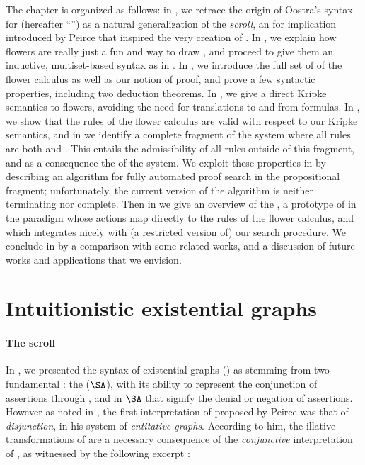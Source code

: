 \begin{scope}
The chapter is organized as follows: in , we retrace the origin of
Oostra's syntax for   (hereafter ``'') as a
natural generalization of the \emph{scroll}, an  for implication introduced
by Peirce that inspired the very creation of . In , we
explain how flowers are really just a fun and  way to draw
, and proceed to give them an inductive, multiset-based syntax as in
. In , we introduce the full set of  of the flower calculus as well as our notion of proof, and prove a few
syntactic properties, including two deduction theorems. In ,
we give a direct Kripke semantics to flowers, avoiding the need for translations
to and from formulas. In , we show that the rules of the
flower calculus are valid with respect to our Kripke semantics, and in
 we identify a complete fragment of the system where all
rules are both \emph{} and \emph{}. This entails the
admissibility of all rules outside of this fragment, and as a consequence the
 of the system. We exploit these properties in
 by describing an algorithm for fully automated proof
search in the propositional fragment; unfortunately, the current version of the
algorithm is neither terminating nor complete. Then in 
we give an overview of the , a prototype of  in the
 paradigm whose actions map directly to the rules of the flower
calculus, and which integrates nicely with (a restricted version of) our search
procedure. We conclude in  by a comparison with some related
works, and a discussion of future works and applications that we envision.


\section{Intuitionistic existential graphs}

\paragraph{The scroll}

In , we presented the syntax of existential graphs () as
stemming from two fundamental : the  ($\SA$),
with its ability to represent the conjunction of assertions through
\emph{}, and \emph{} in $\SA$ that signify the denial or
negation of assertions. However as noted in , the first
interpretation of  proposed by Peirce was that of
\emph{disjunction}, in his system of \emph{entitative graphs}. According to him,
the illative transformations of  are a necessary consequence of the
\emph{conjunctive} interpretation of , as witnessed by the
following excerpt :


\end{scope}
